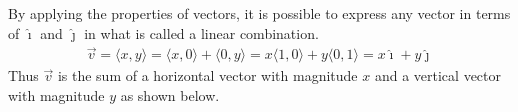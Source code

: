 \documentclass[a4paper]{article}
\let\la\langle
\let\ra\rangle
\newcommand{\ih}{\hat{\imath}}
\newcommand{\jh}{\hat{\jmath}}
\begin{document}
By applying the properties of vectors, it is possible to express any vector in terms of $\ih$ and $\jh$ in what is called a linear combination.
\begin{align*}
    \vec{v} = \la x, y \ra = \la x, 0 \ra + \la 0, y \ra = x\la 1, 0 \ra + y\la 0, 1 \ra = x\ih + y\jh
\end{align*}
Thus $\vec{v}$ is the sum of a horizontal vector with magnitude $x$ and a vertical vector with magnitude $y$ as shown below.
\begin{center}
\end{center}

\newpage
\end{document}
